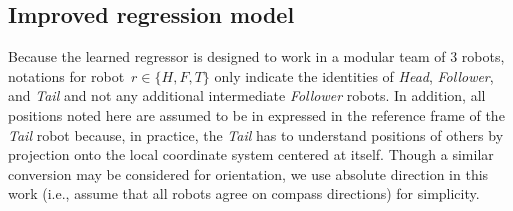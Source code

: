 \documentclass[letterpaper, 10 pt, conference]{ieeeconf}  %
\begin{document}
	\subsection{Improved regression model}
	\label{sec:regression_model}

    Because the learned regressor is designed to work in a modular team
    of $3$ robots, notations for robot~$r \in \{H, F, T\}$ only indicate
    the identities of \emph{Head}, \emph{Follower}, and \emph{Tail} and
    not any additional intermediate \emph{Follower} robots. In addition,
    all positions noted here are assumed to be in expressed in the
    reference frame of the \emph{Tail} robot because, in practice, the
    \emph{Tail} has to understand positions of others by projection onto
    the local coordinate system centered at itself. Though a similar
    conversion may be considered for orientation, we use absolute
    direction in this work (i.e., assume that all robots agree on
    compass directions) for simplicity.
\end{document}
